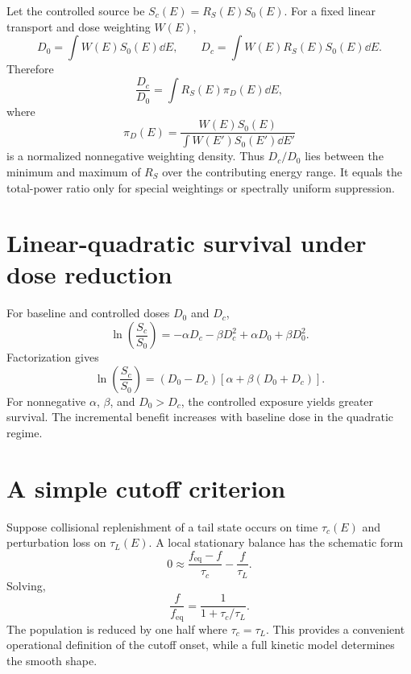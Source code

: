 Let the controlled source be $S_c(E)=R_S(E)S_0(E)$. For a fixed linear transport and dose weighting $W(E)$,
\begin{equation}
D_0=\int W(E)S_0(E)\dd E,
\qquad
D_c=\int W(E)R_S(E)S_0(E)\dd E.
\end{equation}
Therefore
\begin{equation}
\frac{D_c}{D_0}
=\int R_S(E)\pi_D(E)\dd E,
\end{equation}
where
\begin{equation}
\pi_D(E)=\frac{W(E)S_0(E)}{\int W(E')S_0(E')\dd E'}
\end{equation}
is a normalized nonnegative weighting density. Thus $D_c/D_0$ lies between the minimum and maximum of $R_S$ over the contributing energy range. It equals the total-power ratio only for special weightings or spectrally uniform suppression.

\section{Linear-quadratic survival under dose reduction}

For baseline and controlled doses $D_0$ and $D_c$,
\begin{equation}
\ln\left(\frac{S_c}{S_0}\right)
=-\alpha D_c-\beta D_c^2+\alpha D_0+\beta D_0^2.
\end{equation}
Factorization gives
\begin{equation}
\ln\left(\frac{S_c}{S_0}\right)
=(D_0-D_c)\left[\alpha+\beta(D_0+D_c)\right].
\end{equation}
For nonnegative $\alpha$, $\beta$, and $D_0>D_c$, the controlled exposure yields greater survival. The incremental benefit increases with baseline dose in the quadratic regime.

\section{A simple cutoff criterion}

Suppose collisional replenishment of a tail state occurs on time $\tau_c(E)$ and perturbation loss on $\tau_L(E)$. A local stationary balance has the schematic form
\begin{equation}
0\approx\frac{f_{\mathrm{eq}}-f}{\tau_c}-\frac{f}{\tau_L}.
\end{equation}
Solving,
\begin{equation}
\frac{f}{f_{\mathrm{eq}}}
=\frac{1}{1+\tau_c/\tau_L}.
\end{equation}
The population is reduced by one half where $\tau_c=\tau_L$. This provides a convenient operational definition of the cutoff onset, while a full kinetic model determines the smooth shape.


